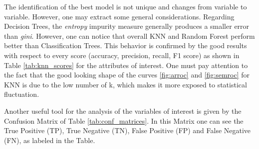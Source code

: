 \documentclass[a4paper,11pt,dvipsnames]{article}
\begin{document}
The identification of the best model is not unique and changes from variable to variable. However, one may extract some general considerations. Regarding Decision Trees, the \textit{entropy} impurity measure generally produces a smaller error than \textit{gini}. However, one can notice that overall KNN and Random Forest perform better than Classification Trees. This behavior is confirmed by the good results with respect to every score (accuracy, precision, recall, F1 score) as shown in Table \ref{tab:knn_scores} for the attributes of interest.
One must pay attention to the fact that the good looking shape of the curves \ref{fig:arroc} and \ref{fig:semroc} for KNN is due to the low number of k, which makes it more exposed to statistical fluctuation. 

Another useful tool for the analysis of the variables of interest is given by the Confusion Matrix of Table \ref{tab:conf_matrices}. In this Matrix one can see the True Positive (TP), True Negative (TN), False Positive (FP) and False Negative (FN), as labeled in the Table.

\begin{table}[h]
    \centering
    \caption{Confusion Matrices for features of interests according to the different algorithms.\\ Green indicates the True Positives, while Yellow the True Negatives.}
    \label{tab:conf_matrices}
\end{table}
\end{document}
